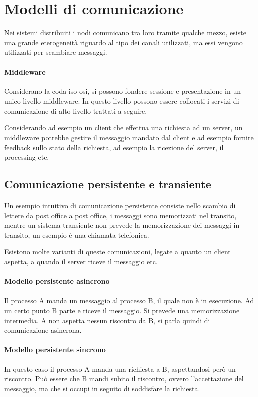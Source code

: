 \section{Modelli di comunicazione}
Nei sistemi distribuiti i nodi comunicano tra loro tramite qualche
mezzo, esiste una grande eterogeneità riguardo al tipo dei canali utilizzati, 
ma essi vengono utilizzati per scambiare messaggi.

\paragraph{Middleware}
Considerano la coda iso osi, si possono fondere sessione e presentazione 
in un unico livello middleware. In questo livello possono essere collocati i 
servizi di comunicazione di alto livello trattati a seguire.

Considerando ad esempio un client che effettua una richiesta ad un 
server, un middleware potrebbe gestire il messaggio mandato 
dal client e ad esempio fornire feedback sullo stato della richiesta, 
ad esempio la ricezione del server, il processing etc.
\subsection{Comunicazione persistente e transiente}
Un esempio intuitivo di comunicazione persistente consiste nello scambio 
di lettere da post office a post office, i messaggi sono 
memorizzati nel transito, mentre un sistema transiente non 
prevede la memorizzazione dei messaggi in transito, un esempio è una chiamata 
telefonica.

Esistono molte varianti di queste comunicazioni, legate a quanto 
un client aspetta, a quando il server riceve il messaggio etc.

\paragraph{Modello persistente asincrono}
Il processo A manda un messaggio al processo B, il quale non è in esecuzione.
Ad un certo punto B parte e riceve il messaggio. Si prevede una memorizzazione 
intermedia. A non aspetta nessun riscontro da B, si parla quindi di comunicazione 
asincrona.

\paragraph{Modello persistente sincrono}
In questo caso il processo A manda una richiesta a B, aspettandosi però 
un riscontro.
Può essere che B mandi subito il riscontro, ovvero l'accettazione del messaggio, 
ma che si occupi in seguito di soddisfare la richiesta.

